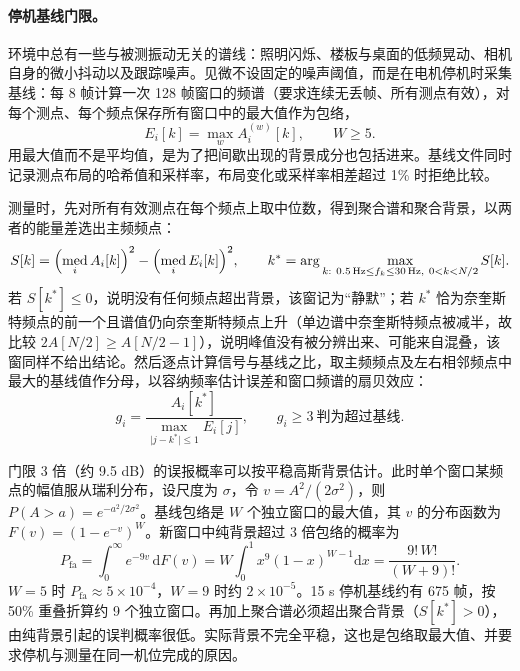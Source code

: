 \paragraph{停机基线门限。}环境中总有一些与被测振动无关的谱线：照明闪烁、楼板与桌面的低频晃动、相机自身的微小抖动以及跟踪噪声。见微不设固定的噪声阈值，而是在电机停机时采集基线：每 8 帧计算一次 128 帧窗口的频谱（要求连续无丢帧、所有测点有效），对每个测点、每个频点保存所有窗口中的最大值作为包络，
\begin{equation}
E_i[k]=\max_{w}A_i^{(w)}[k],\qquad W\ge5 .
\end{equation}
用最大值而不是平均值，是为了把间歇出现的背景成分也包括进来。基线文件同时记录测点布局的哈希值和采样率，布局变化或采样率相差超过 1\% 时拒绝比较。

测量时，先对所有有效测点在每个频点上取中位数，得到聚合谱和聚合背景，以两者的能量差选出主频频点：
\begin{equation}
S[k]=\Bigl(\operatorname*{med}_i A_i[k]\Bigr)^2-\Bigl(\operatorname*{med}_i E_i[k]\Bigr)^2,\qquad
k^*=\arg\max_{k:\ 0.5\,\mathrm{Hz}\le f_k\le30\,\mathrm{Hz},\ 0<k<N/2} S[k] .
\end{equation}
若 $S[k^*]\le0$，说明没有任何频点超出背景，该窗记为“静默”；若 $k^*$ 恰为奈奎斯特频点的前一个且谱值仍向奈奎斯特频点上升（单边谱中奈奎斯特频点被减半，故比较 $2A[N/2]\ge A[N/2-1]$），说明峰值没有被分辨出来、可能来自混叠，该窗同样不给出结论。然后逐点计算信号与基线之比，取主频频点及左右相邻频点中最大的基线值作分母，以容纳频率估计误差和窗口频谱的扇贝效应：
\begin{equation}
g_i=\frac{A_i[k^*]}{\max\limits_{\lvert j-k^*\rvert\le1}E_i[j]},\qquad g_i\ge3\ \text{判为超过基线}.
\end{equation}

门限 3 倍（约 9.5 dB）的误报概率可以按平稳高斯背景估计。此时单个窗口某频点的幅值服从瑞利分布，设尺度为 $\sigma$，令 $v=A^2/(2\sigma^2)$，则 $P(A>a)=e^{-a^2/2\sigma^2}$。基线包络是 $W$ 个独立窗口的最大值，其 $v$ 的分布函数为 $F(v)=(1-e^{-v})^W$。新窗口中纯背景超过 3 倍包络的概率为
\begin{equation}
P_{\mathrm{fa}}=\int_0^\infty e^{-9v}\,\mathrm{d}F(v)=W\!\int_0^1\!x^{9}(1-x)^{W-1}\mathrm{d}x=\frac{9!\,W!}{(W+9)!} .
\end{equation}
$W=5$ 时 $P_{\mathrm{fa}}\approx5\times10^{-4}$，$W=9$ 时约 $2\times10^{-5}$。15 s 停机基线约有 675 帧，按 50\% 重叠折算约 9 个独立窗口。再加上聚合谱必须超出聚合背景（$S[k^*]>0$），由纯背景引起的误判概率很低。实际背景不完全平稳，这也是包络取最大值、并要求停机与测量在同一机位完成的原因。

